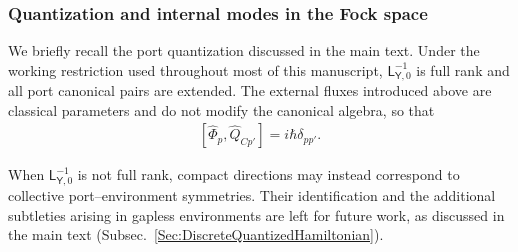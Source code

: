 \documentclass[prx,aps,twocolumn,article]{revtex4-2}
\newcommand{\msf}[1]{\mathsf{#1}}
\newcommand{\msY}{\msf{Y}}
\newcommand{\msL}{\msf{L}}
\begin{document}
\subsubsection{Quantization and internal modes in the Fock space}
\label{AppSubsubsec:Quantization_Fock_Y}

We briefly recall the port quantization discussed in the main text.
Under the working restriction used throughout most of this manuscript,
$\msL_{\msY,0}^{-1}$ is full rank and all port canonical pairs are
extended. The external fluxes introduced above are classical
parameters and do not modify the canonical algebra, so that
\begin{align}
    \left[
        \hat{\Phi}_p,
        \hat{Q}_{Cp'}
    \right]
    =
    i\hbar\delta_{pp'}.
    \label{Eq:PortQuantizationY}
\end{align}

When $\msL_{\msY,0}^{-1}$ is not full rank, compact directions may
instead correspond to collective port--environment symmetries. Their
identification and the additional subtleties arising in gapless
environments are left for future work, as discussed in the main text
(Subsec.~\ref{Sec:DiscreteQuantizedHamiltonian}).
\end{document}
